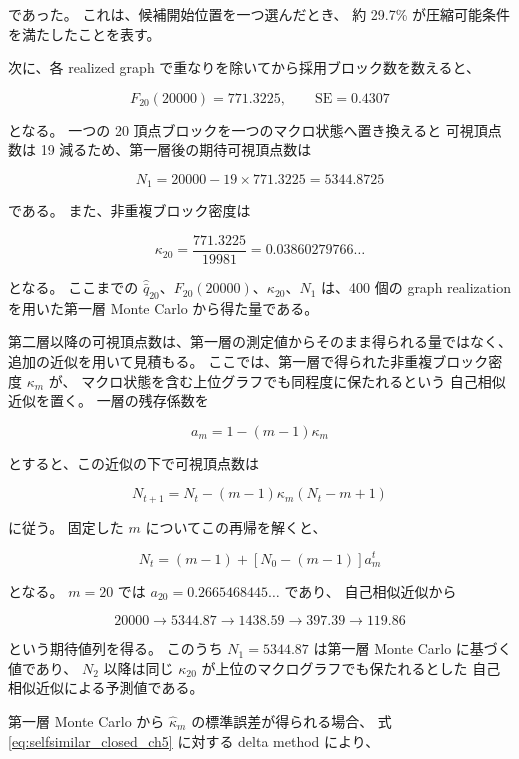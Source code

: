 \documentclass[a4j,10pt]{ujarticle}
\begin{document}
であった。
これは、候補開始位置を一つ選んだとき、
約 29.7\% が圧縮可能条件を満たしたことを表す。

次に、各 realized graph で重なりを除いてから採用ブロック数を数えると、

\[
F_{20}(20000)
=
771.3225,
\qquad
\mathrm{SE}=0.4307
\]

となる。
一つの 20 頂点ブロックを一つのマクロ状態へ置き換えると
可視頂点数は 19 減るため、第一層後の期待可視頂点数は

\[
N_1
=
20000-19\times771.3225
=
5344.8725
\]

である。
また、非重複ブロック密度は

\[
\kappa_{20}
=
\frac{771.3225}{19981}
=
0.03860279766\ldots
\]

となる。
ここまでの
$\widehat{\bar q}_{20}$、$F_{20}(20000)$、$\kappa_{20}$、$N_1$
は、400 個の graph realization を用いた第一層 Monte Carlo から得た量である。

第二層以降の可視頂点数は、第一層の測定値からそのまま得られる量ではなく、
追加の近似を用いて見積もる。
ここでは、第一層で得られた非重複ブロック密度 $\kappa_m$ が、
マクロ状態を含む上位グラフでも同程度に保たれるという
自己相似近似を置く。
一層の残存係数を

\[
a_m
=
1-(m-1)\kappa_m
\]

とすると、この近似の下で可視頂点数は

\begin{equation}
N_{t+1}
=
N_t-(m-1)\kappa_m(N_t-m+1)
\label{eq:selfsimilar_ch5}
\end{equation}

に従う。
固定した $m$ についてこの再帰を解くと、

\begin{equation}
N_t
=
(m-1)
+
[N_0-(m-1)]a_m^t
\label{eq:selfsimilar_closed_ch5}
\end{equation}

となる。
$m=20$ では $a_{20}=0.2665468445\ldots$ であり、
自己相似近似から

\[
20000
\rightarrow
5344.87
\rightarrow
1438.59
\rightarrow
397.39
\rightarrow
119.86
\]

という期待値列を得る。
このうち $N_1=5344.87$ は第一層 Monte Carlo に基づく値であり、
$N_2$ 以降は同じ $\kappa_{20}$ が上位のマクログラフでも保たれるとした
自己相似近似による予測値である。

第一層 Monte Carlo から $\widehat\kappa_m$ の標準誤差が得られる場合、
式\eqref{eq:selfsimilar_closed_ch5} に対する delta method により、
\end{document}
